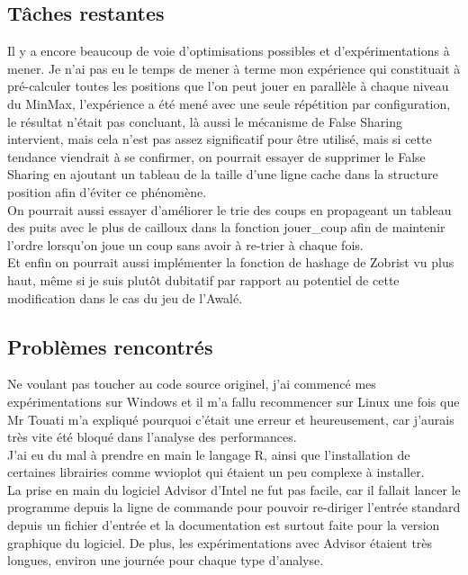 \documentclass[
 aip,
 jmp,
 amsmath,amssymb,
 reprint
]{revtex4-1}
\begin{document}
\subsection{Tâches restantes}
Il y a encore beaucoup de voie d'optimisations possibles et d'expérimentations à mener. Je n'ai pas eu le temps de mener à terme mon expérience qui constituait à pré-calculer toutes les positions que l'on peut jouer en parallèle à chaque niveau du MinMax, l'expérience a été mené avec une seule répétition par configuration, le résultat n'était pas concluant, là aussi le mécanisme de False Sharing intervient, mais cela n'est pas assez significatif pour être utilisé, mais si cette tendance viendrait à se confirmer, on pourrait essayer de supprimer le False Sharing en ajoutant un tableau de la taille d'une ligne cache dans la structure position afin d'éviter ce phénomène.\\
On pourrait aussi essayer d'améliorer le trie des coups en propageant un tableau des puits avec le plus de cailloux dans la fonction jouer\_coup afin de maintenir l'ordre lorsqu'on joue un coup sans avoir à re-trier à chaque fois.\\
Et enfin on pourrait aussi implémenter la fonction de hashage de Zobrist vu plus haut, même si je suis plutôt dubitatif par rapport au potentiel de cette modification dans le cas du jeu de l'Awalé.

\subsection{Problèmes rencontrés}
Ne voulant pas toucher au code source originel, j'ai commencé mes expérimentations sur Windows et il m'a fallu recommencer sur Linux une fois que Mr Touati m'a expliqué pourquoi c'était une erreur et heureusement, car j'aurais très vite été bloqué dans l'analyse des performances.\\
J'ai eu du mal à prendre en main le langage R, ainsi que l'installation de certaines librairies comme wvioplot qui étaient un peu complexe à installer.\\
La prise en main du logiciel Advisor d'Intel ne fut pas facile, car il fallait lancer le programme depuis la ligne de commande pour pouvoir re-diriger l'entrée standard depuis un fichier d'entrée et la documentation est surtout faite pour la version graphique du logiciel. De plus, les expérimentations avec Advisor étaient très longues, environ une journée pour chaque type d'analyse.
\clearpage
\end{document}
